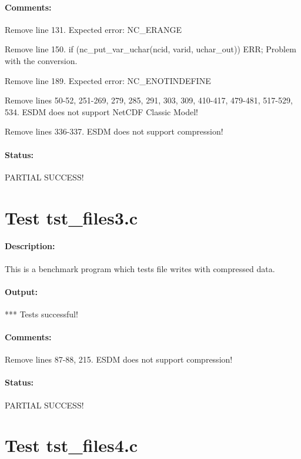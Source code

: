\paragraph{Comments:} Remove line 131. Expected error: NC\_ERANGE

Remove line 150. if (nc\_put\_var\_uchar(ncid, varid, uchar\_out)) ERR; Problem with the conversion.

Remove line 189. Expected error: NC\_ENOTINDEFINE

Remove lines 50-52, 251-269, 279, 285, 291, 303, 309, 410-417, 479-481, 517-529, 534. ESDM does not support NetCDF Classic Model!

Remove lines 336-337. ESDM does not support compression!

\paragraph{Status:} PARTIAL SUCCESS!

{\color{blue}{Help, Julian!}}

\section{Test tst\_files3.c}

\paragraph{Description:} This is a benchmark program which tests file writes with compressed data.

\paragraph{Output:} *** Tests successful!

\paragraph{Comments:} Remove lines 87-88, 215. ESDM does not support compression!

\paragraph{Status:} PARTIAL SUCCESS!

\section{Test tst\_files4.c}

